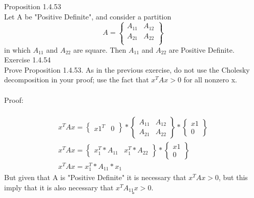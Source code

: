 \documentclass{article}
\begin{document}
	Proposition 1.4.53\\
	Let A be "Positive Definite", and consider a partition 
	$$A = \begin{Bmatrix}
	A_{11}&A_{12}\\
	A_{21}&A_{22}\\
	\end{Bmatrix}$$
	in which $A_{11}$ and $A_{22}$ are square. Then $A_{11}$ and $A_{22}$ are Positive Definite.\\ 
	Exercise 1.4.54\\
	Prove Proposition 1.4.53. As in the previous exercise, do not use the Cholesky 
	decomposition in your proof; use the fact that $x^TAx > 0$ for all nonzero x.\\
	\\
	Proof:\\
	\\
	\begin{align*}
		x^TAx = \begin{Bmatrix} x1^T & 0\end{Bmatrix}*\begin{Bmatrix}
			A_{11} & A_{12}\\
			A_{21} & A_{22}
		\end{Bmatrix}*\begin{Bmatrix} x1 \\ 0\end{Bmatrix}\\
		x^TAx = \begin{Bmatrix}
			x_1^T*A_{11} & x_1^T*A_{22}
		\end{Bmatrix}*\begin{Bmatrix} x1 \\ 0\end{Bmatrix}\\		
		x^TAx = x_1^T*A_{11}*x_1
	\end{align*}
	But given that A is "Positive Definite" it is necessary that $x^TAx >0$, but this imply that it is also necessary that $x^TA_{11}x > 0$.
	$$\square$$	
\end{document}
